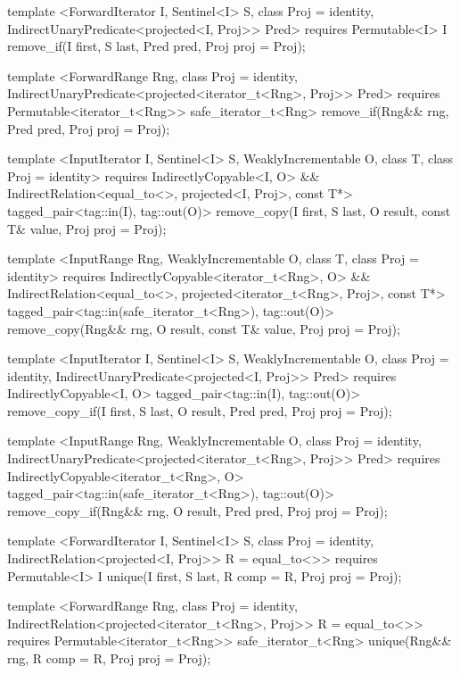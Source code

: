 {\begin{codeblock}
{{    template <ForwardIterator I, Sentinel<I> S, class Proj = identity,
        IndirectUnaryPredicate<projected<I, Proj>> Pred>
      requires Permutable<I>
      I remove_if(I first, S last, Pred pred, Proj proj = Proj{});

    template <ForwardRange Rng, class Proj = identity,
        IndirectUnaryPredicate<projected<iterator_t<Rng>, Proj>> Pred>
      requires Permutable<iterator_t<Rng>>
      safe_iterator_t<Rng>
        remove_if(Rng&& rng, Pred pred, Proj proj = Proj{});

    template <InputIterator I, Sentinel<I> S, WeaklyIncrementable O, class T,
        class Proj = identity>
      requires IndirectlyCopyable<I, O> &&
        IndirectRelation<equal_to<>, projected<I, Proj>, const T*>
      tagged_pair<tag::in(I), tag::out(O)>
        remove_copy(I first, S last, O result, const T& value, Proj proj = Proj{});

    template <InputRange Rng, WeaklyIncrementable O, class T, class Proj = identity>
      requires IndirectlyCopyable<iterator_t<Rng>, O> &&
        IndirectRelation<equal_to<>, projected<iterator_t<Rng>, Proj>, const T*>
      tagged_pair<tag::in(safe_iterator_t<Rng>), tag::out(O)>
        remove_copy(Rng&& rng, O result, const T& value, Proj proj = Proj{});

    template <InputIterator I, Sentinel<I> S, WeaklyIncrementable O,
        class Proj = identity, IndirectUnaryPredicate<projected<I, Proj>> Pred>
      requires IndirectlyCopyable<I, O>
      tagged_pair<tag::in(I), tag::out(O)>
        remove_copy_if(I first, S last, O result, Pred pred, Proj proj = Proj{});

    template <InputRange Rng, WeaklyIncrementable O, class Proj = identity,
        IndirectUnaryPredicate<projected<iterator_t<Rng>, Proj>> Pred>
      requires IndirectlyCopyable<iterator_t<Rng>, O>
      tagged_pair<tag::in(safe_iterator_t<Rng>), tag::out(O)>
        remove_copy_if(Rng&& rng, O result, Pred pred, Proj proj = Proj{});

    template <ForwardIterator I, Sentinel<I> S, class Proj = identity,
        IndirectRelation<projected<I, Proj>> R = equal_to<>>
      requires Permutable<I>
      I unique(I first, S last, R comp = R{}, Proj proj = Proj{});

    template <ForwardRange Rng, class Proj = identity,
        IndirectRelation<projected<iterator_t<Rng>, Proj>> R = equal_to<>>
      requires Permutable<iterator_t<Rng>>
      safe_iterator_t<Rng>
        unique(Rng&& rng, R comp = R{}, Proj proj = Proj{});

}}
\end{codeblock}}
